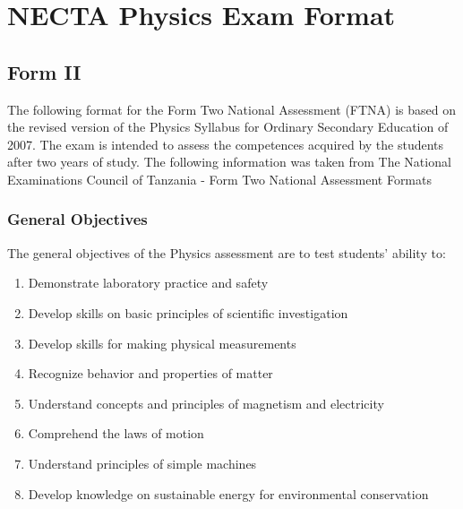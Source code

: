 \section{NECTA Physics Exam Format}
\label{sec:physics-format}

\subsection{Form II}
\noindent The following format for the Form Two National Assessment (FTNA) is based on the revised version of the Physics Syllabus for Ordinary Secondary Education of 2007. The exam is intended to assess the competences acquired by the students after two years of study. The following information was taken from The National Examinations Council of Tanzania - Form Two National Assessment Formats %

\subsubsection{General Objectives}
\noindent The general objectives of the Physics assessment are to test students' ability to:
\begin{enumerate}[topsep=1ex,itemsep=0ex,partopsep=1ex,parsep=1ex]
	\item Demonstrate laboratory practice and safety
	\item Develop skills on basic principles of scientific investigation
	\item Develop skills for making physical measurements
	\item Recognize behavior and properties of matter
	\item Understand concepts and principles of magnetism and electricity
	\item Comprehend the laws of motion
	\item Understand principles of simple machines
	\item Develop knowledge on sustainable energy for environmental conservation
\end{enumerate}

